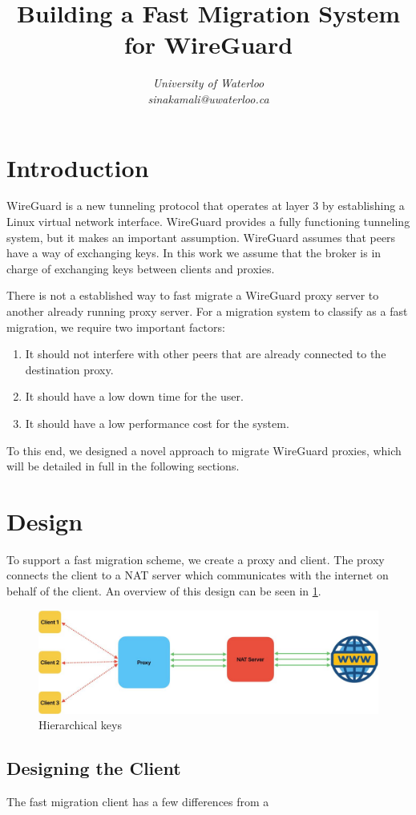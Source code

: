 \documentclass[conference]{IEEEtran}
\begin{document}
\title{Building a Fast Migration System for WireGuard}

\author{
\textit{University of Waterloo}\\
\textit{sinakamali@uwaterloo.ca}
}

\maketitle

\section{Introduction}
WireGuard \parencite[]{Donenfeld2017} is a new tunneling protocol that operates at layer 3 by establishing a Linux virtual network interface. WireGuard provides a fully functioning tunneling system, but it makes an important assumption. WireGuard assumes that peers have a way of exchanging keys. In this work we assume that the broker is in charge of exchanging keys between clients and proxies.

There is not a established way to fast migrate a WireGuard proxy server to another already running proxy server. For a migration system to classify as a fast migration, we require two important factors:

\begin{enumerate}
    \item It should not interfere with other peers that are already connected to the destination proxy.
    \item It should have a low down time for the user.
    \item It should have a low performance cost for the system.
\end{enumerate}

To this end, we designed a novel approach to migrate WireGuard proxies, which will be detailed in full in the following sections.

\section{Design}
To support a fast migration scheme, we create a proxy and client. The proxy connects the client to a NAT server which communicates with the internet on behalf of the client. An overview of this design can be seen in \ref*{fig:odesign}.

\begin{figure}[h]
    \centering
    \includegraphics[scale=0.19]{fig1.jpeg}
    \caption{Hierarchical keys}
    \label{fig:odesign}
\end{figure}

\subsection{Designing the Client}
The fast migration client has a few differences from a 

\printbibliography
\end{document}
